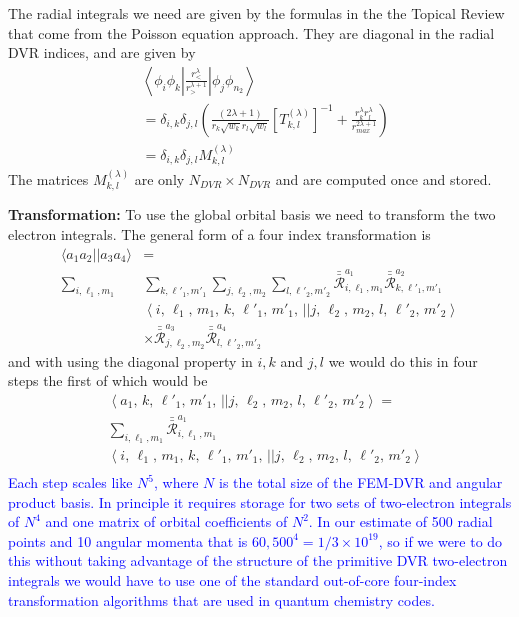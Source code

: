 \documentclass[%
pra%
,twocolumn%
,amssymb, nobibnotes, aps,
longbibliography
]{revtex4-1}
\begin{document}
The radial integrals we need are given by the formulas in the 
the Topical Review \cite{TopicalReview2004} that come from 
the Poisson equation approach.  They are diagonal in the radial 
DVR indices, and are given by 
\begin{equation}
\begin{split}
& \left< \phi_{i} \phi_{k}|\frac{r_<^\lambda}{r_>^{\lambda+1}}| 
\phi_{j}\phi_{n_2}\right> \\
&= 
\delta_{i,k}\delta_{j,l}
\left(
\frac{(2\lambda+1)} { r_{k}\sqrt{w_{k}} r_{l} \sqrt{w_{l}}}
\left[T_{k,l}^{(\lambda)}\right]^{-1}
+
\frac{ r_{k}^\lambda  r_{l}^\lambda}{r_{max}^{2\lambda+1}}
\right) \\
&= \delta_{i,k} \delta_{j,l} M^{(\lambda)}_{k,l}
\end{split}
\label{final2e}
\end{equation}
The matrices $M^{(\lambda)}_{k,l}$ are only $N_{DVR} \times N_{DVR}$ and are computed once and stored.  

\noindent \textbf{Transformation:}  To use the global orbital basis we need to transform the two electron integrals.  The general form of a 
four index transformation is
\begin{equation}
\begin{split}
\langle a_1 a_2 || a_3 a_4 \rangle &= \\
\sum_{i,\ell_1,m_1} &\sum_{k,\ell'_1,m'_1}\sum_{j,\ell_2,m_2} \sum_{l,\ell'_2,m'_2}
\bar{\bar{{\mathcal{R}}}}_{i,\ell_1,m_1}^{a_1} 
\bar{\bar{{\mathcal{R}}}}_{k,\ell'_1,m'_1}^{a_2}  \\
&\left<  i ,\, \ell_1, \, m_1, \, k ,\, \ell'_1, \, m'_1, \, ||
j, \,\ell_2, \, m_2, \,  l, \,\ell'_2, \, m'_2 \right> \\
&\times \bar{\bar{{\mathcal{R}}}}_{j,\ell_2,m_2}^{a_3} 
\bar{\bar{{\mathcal{R}}}}_{l,\ell'_2,m'_2}^{a_4} 
\end{split}
\end{equation}
and with using the diagonal property in $i,k$ and $j,l$ we would do this in four steps the first of which would be 
\begin{equation}
\begin{split}
&\left< a_1, \, k ,\, \ell'_1, \, m'_1, \,  || j, \,\ell_2, \, m_2, \,  l, \,\ell'_2, \, m'_2 \right> = \\
&\sum_{i,\ell_1,m_1} 
\bar{\bar{{\mathcal{R}}}}_{i,\ell_1,m_1}^{a_1} 
\\
&\left<  i ,\, \ell_1, \, m_1, \, k ,\, \ell'_1, \, m'_1, \, ||
j, \,\ell_2, \, m_2, \,  l, \,\ell'_2, \, m'_2 \right> \\
\end{split}
\end{equation}
\textcolor{blue}{Each step scales like $N^5$, where $N$ is the total size of the FEM-DVR and angular product basis.  In principle it requires storage for
two sets of two-electron integrals of $N^4$ and one matrix of orbital coefficients of $N^2$.  In our estimate of 500 radial points and 10 angular momenta that is $60,500^4 = 1/3\times 10^{19}$, so if we were to do this without taking advantage of the structure of the  primitive DVR two-electron integrals we would have to use one of the standard out-of-core four-index transformation algorithms that are used in quantum chemistry codes.}
\end{document}
